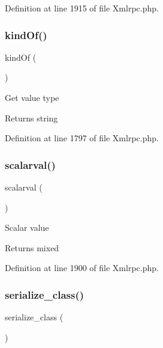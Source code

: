 Definition at line 1915 of file Xmlrpc.\+php.

\mbox{\label{class_x_m_l___r_p_c___values_a3b169c364729cee2afdccadef5229f80}} 
\subsubsection{\texorpdfstring{kindOf()}{kindOf()}}
{\footnotesize\ttfamily kind\+Of (\begin{DoxyParamCaption}{ }\end{DoxyParamCaption})}

Get value type

\begin{DoxyReturn}{Returns}
string 
\end{DoxyReturn}


Definition at line 1797 of file Xmlrpc.\+php.

\mbox{\label{class_x_m_l___r_p_c___values_ac9a3751dc2d5479f409d0a4683c37d26}} 
\subsubsection{\texorpdfstring{scalarval()}{scalarval()}}
{\footnotesize\ttfamily scalarval (\begin{DoxyParamCaption}{ }\end{DoxyParamCaption})}

Scalar value

\begin{DoxyReturn}{Returns}
mixed 
\end{DoxyReturn}


Definition at line 1900 of file Xmlrpc.\+php.

\mbox{\label{class_x_m_l___r_p_c___values_a59df3d3c8fbb47a946d6a29f0b3c8e0c}} 
\subsubsection{\texorpdfstring{serialize\_class()}{serialize\_class()}}
{\footnotesize\ttfamily serialize\+\_\+class (\begin{DoxyParamCaption}{ }\end{DoxyParamCaption})}

